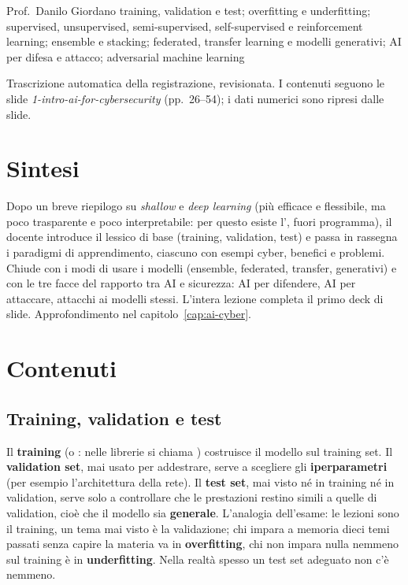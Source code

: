   {Prof.~Danilo Giordano}
  {training, validation e test; overfitting e underfitting; supervised, unsupervised,
   semi-supervised, self-supervised e reinforcement learning; ensemble e stacking; federated,
   transfer learning e modelli generativi; AI per difesa e attacco; adversarial machine learning}
\label{lez:2026-09-23}

\begin{nota}[Fonte]
Trascrizione automatica della registrazione, revisionata. I contenuti seguono le slide
\emph{1-intro-ai-for-cybersecurity} (pp.~26--54); i dati numerici sono ripresi dalle slide.
\end{nota}

\section{Sintesi}
Dopo un breve riepilogo su \emph{shallow} e \emph{deep learning} (più efficace e flessibile, ma
poco trasparente e poco interpretabile: per questo esiste l', fuori
programma), il docente introduce il lessico di base (training, validation, test) e passa in
rassegna i paradigmi di apprendimento, ciascuno con esempi cyber, benefici e problemi. Chiude con i
modi di usare i modelli (ensemble, federated, transfer, generativi) e con le tre facce del rapporto
tra AI e sicurezza: AI per difendere, AI per attaccare, attacchi ai modelli stessi. L'intera
lezione completa il primo deck di slide. Approfondimento nel capitolo~\ref{cap:ai-cyber}.

\section{Contenuti}

\subsection{Training, validation e test}
Il \textbf{training} (o : nelle librerie si chiama ) costruisce il modello
sul training set. Il \textbf{validation set}, mai usato per addestrare, serve a scegliere gli
\textbf{iperparametri} (per esempio l'architettura della rete). Il \textbf{test set}, mai visto né in
training né in validation, serve solo a controllare che le prestazioni restino simili a quelle di
validation, cioè che il modello sia \textbf{generale}. L'analogia dell'esame: le lezioni sono il
training, un tema mai visto è la validazione; chi impara a memoria dieci temi passati senza capire
la materia va in \textbf{overfitting}, chi non impara nulla nemmeno sul training è in
\textbf{underfitting}. Nella realtà spesso un test set adeguato non c'è nemmeno.

